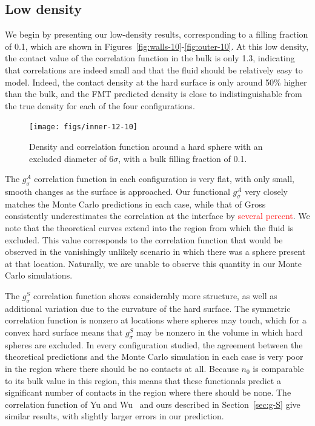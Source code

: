 \documentclass[letterpaper,twocolumn,amsmath,amssymb,jcp,10pt,aip]{revtex4-1}
\begin{document}
\subsection{Low density}

We begin by presenting our low-density results, corresponding to a
filling fraction of 0.1, which are shown in
Figures~\ref{fig:walls-10}-\ref{fig:outer-10}.  At this low density,
the contact value of the correlation function in the bulk is only 1.3,
indicating that correlations are indeed small and that the fluid should be
relatively easy to model.  Indeed, the contact density at the hard
surface is only around 50\% higher than the bulk, and the FMT
predicted density is close to indistinguishable from the true
density for each of the four configurations.

\begin{figure}
  \texttt{[image: figs/inner-12-10]}
  \caption{Density and correlation function around a hard sphere with
    an excluded diameter of $6\sigma$, with a bulk filling fraction of
    0.1.}
  \label{fig:inner-12-10}
\end{figure}

The $g_\sigma^A$ correlation function in each configuration is very
flat, with only small, smooth changes as the surface is approached.
Our functional $g_\sigma^A$ very closely matches the Monte Carlo
predictions in each case, while that of Gross consistently
underestimates the correlation at the interface by
\textcolor{red}{several percent}.  We note that the theoretical curves
extend into the region from which the fluid is excluded.  This value
corresponds to the correlation function that would be observed in the
vanishingly unlikely scenario in which there was a sphere present at
that location.  Naturally, we are unable to observe this quantity in
our Monte Carlo simulations.

The $g_\sigma^S$ correlation function shows considerably more
structure, as well as additional variation due to the curvature of the
hard surface.  The symmetric correlation function is nonzero at
locations where spheres may touch, which for a convex hard surface
means that $g_\sigma^S$ may be nonzero in the volume in which hard
spheres are excluded.  In every configuration studied, the agreement
between the theoretical predictions and the Monte Carlo simulation in
each case is very poor in the region where there should be no contacts
at all.  Because $n_0$ is comparable to its bulk value in this region,
this means that these functionals predict a significant number of
contacts in the region where there should be none.  The correlation
function of Yu and Wu~\cite{yu2002fmt-dft-inhomogeneous-associating}
and ours described in Section~\ref{sec:g-S} give similar results, with
slightly larger errors in our prediction.
\end{document}
